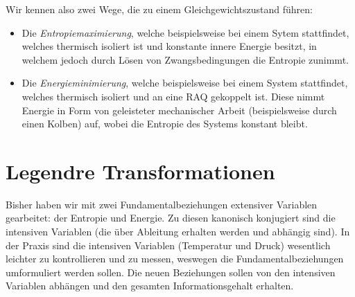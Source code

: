 Wir kennen also zwei Wege, die zu einem Gleichgewichtszustand führen: 
\begin{itemize}
    \item Die \emph{Entropiemaximierung}, welche beispielsweise bei einem Sytem stattfindet, welches thermisch isoliert ist und konstante innere Energie besitzt, in welchem jedoch durch Lösen von Zwangsbedingungen die Entropie zunimmt.
    \item Die \emph{Energieminimierung}, welche beispielsweise bei einem System stattfindet, welches thermisch isoliert und an eine RAQ gekoppelt ist. Diese nimmt Energie in Form von geleisteter mechanischer Arbeit (beispielsweise durch einen Kolben) auf, wobei die Entropie des Systems konstant bleibt.
\end{itemize}

\section{Legendre Transformationen}
Bisher haben wir mit zwei Fundamentalbeziehungen extensiver Variablen gearbeitet: der Entropie und Energie. Zu diesen kanonisch konjugiert sind die intensiven Variablen (die über Ableitung erhalten werden und abhängig sind).
In der Praxis sind die intensiven Variablen (Temperatur und Druck) wesentlich leichter zu kontrollieren und zu messen, weswegen die Fundamentalbeziehungen umformuliert werden sollen. Die neuen Beziehungen sollen von den intensiven Variablen abhängen und den gesamten Informationsgehalt erhalten. 

